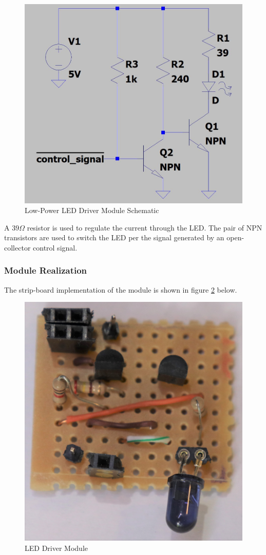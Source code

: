 \begin{figure}[H]
	\centering
	\includegraphics[width=.6\textwidth]{figures/design/low_power_led_driver.JPG}
	\caption{Low-Power LED Driver Module Schematic}
	\label{fig:schematic_low_power_led_driver}
\end{figure}

A $39\Omega$ resistor is used to regulate the current through the LED. The pair of NPN transistors are used to switch the LED per the signal generated by an open-collector control signal.

\subsubsection{Module Realization}
The strip-board implementation of the module is shown in figure \ref{fig:module_led_driver} below.

\begin{figure}[H]
	\centering
	\includegraphics[width=.6\textwidth]{figures/modules/led_driver.jpg}
	\caption{LED Driver Module}
	\label{fig:module_led_driver}
\end{figure}




